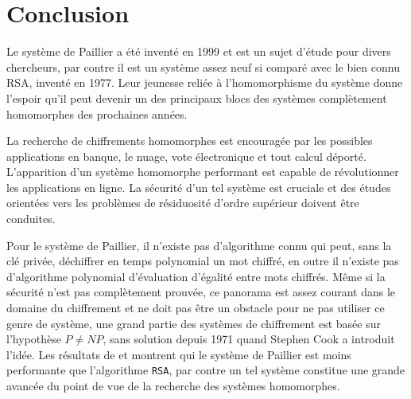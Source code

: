 \chapter{Conclusion}

Le système de Paillier a été inventé en 1999 et est un sujet d'étude pour divers chercheurs, par contre
il est un système assez neuf si comparé avec le bien connu RSA, inventé en 1977.
Leur jeunesse reliée à l'homomorphisme du sys\-tè\-me donne l'espoir qu'il peut devenir 
un des principaux blocs des systèmes complètement homomorphes des %
pro\-chai\-nes années.


La recherche de chiffrements homomorphes est encouragée par les possibles applications en banque, le nuage, vote électronique et
tout calcul déporté. L'apparition d'un système homomorphe performant est capable de ré\-vo\-lu\-tion\-ner 
les applications en ligne. La sécurité d'un tel système est cruciale et des études orientées vers les problèmes 
de résiduosité d'ordre supérieur doivent être conduites. 

Pour le système de Paillier, 
il n'existe pas d'algorithme connu qui peut, sans la clé privée, dé\-chif\-frer en temps polynomial
un mot chiffré, en outre il n'existe pas d'algorithme polynomial d'évaluation d'égalité entre mots chiffrés.   
Même si la sécurité n'est pas complètement prouvée, ce panorama est assez courant dans le domaine du chiffrement
et ne doit pas être un obstacle pour ne pas utiliser ce genre de système, une grand partie des systèmes de chiffrement 
est basée sur l'hypothèse $P \not= NP$, sans solution depuis 1971 quand Stephen Cook a introduit l'idée. Les résultats 
de \cite{DBLP:conf/eurocrypt/Paillier99} et \cite{Damgard:2001:GSA:648118.746742} montrent qui le système de Paillier 
est moins performante que l'algorithme \verb!RSA!, par contre
un tel système constitue une grande avancée du point de vue de la recherche des systèmes homomorphes. 


	





